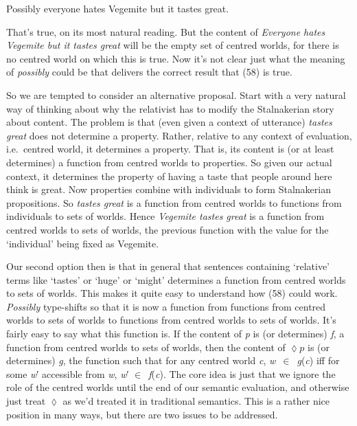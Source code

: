 \documentclass[
  11pt,
  letterpaper,
  DIV=11,
  numbers=noendperiod,
  twoside]{scrartcl}
\providecommand{\tightlist}{%
  \setlength{\itemsep}{0pt}\setlength{\parskip}{0pt}}
\begin{document}
\begin{description}
\tightlist
\item[(58)]
Possibly everyone hates Vegemite but it tastes great.
\end{description}

That's true, on its most natural reading. But the content of
\emph{Everyone hates Vegemite but it tastes great} will be the empty set
of centred worlds, for there is no centred world on which this is true.
Now it's not clear just what the meaning of \emph{possibly} could be
that delivers the correct result that (58) is true.

So we are tempted to consider an alternative proposal. Start with a very
natural way of thinking about why the relativist has to modify the
Stalnakerian story about content. The problem is that (even given a
context of utterance) \emph{tastes great} does not determine a property.
Rather, relative to any context of evaluation, i.e.~centred world, it
determines a property. That is, its content is (or at least determines)
a function from centred worlds to properties. So given our actual
context, it determines the property of having a taste that people around
here think is great. Now properties combine with individuals to form
Stalnakerian propositions. So \emph{tastes great} is a function from
centred worlds to functions from individuals to sets of worlds. Hence
\emph{Vegemite tastes great} is a function from centred worlds to sets
of worlds, the previous function with the value for the `individual'
being fixed as Vegemite.

Our second option then is that in general that sentences containing
`relative' terms like `tastes' or `huge' or `might' determines a
function from centred worlds to sets of worlds. This makes it quite easy
to understand how (58) could work. \emph{Possibly} type-shifts so that
it is now a function from functions from centred worlds to sets of
worlds to functions from centred worlds to sets of worlds. It's fairly
easy to say what this function is. If the content of \emph{p} is (or
determines) \emph{f}, a function from centred worlds to sets of worlds,
then the content of \(\lozenge p\) is (or determines) \emph{g}, the
function such that for any centred world \emph{c},
\emph{w}~\({\in}\)~\emph{g}(\emph{c}) iff for some \emph{w}′ accessible
from \emph{w}, \emph{w}′ \({\in}\)~\emph{f}(\emph{c}). The core idea is
just that we ignore the role of the centred worlds until the end of our
semantic evaluation, and otherwise just treat \(\lozenge\) as we'd
treated it in traditional semantics. This is a rather nice position in
many ways, but there are two issues to be addressed.
\end{document}
